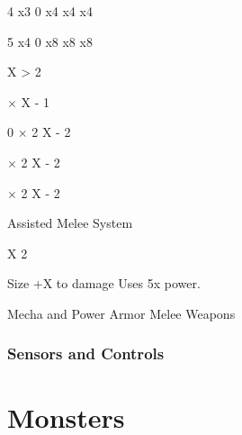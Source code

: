 \documentclass[twoside]{book}
\begin{document}
                  
                   4   
                   x3   
                   0   
                   x4   
                   x4   
                   x4   
                  
                  
                   5   
                   x4   
                   0   
                   x8   
                   x8   
                   x8   
                  
                  
                         X    >  
                      2   
                    
                         \ensuremath{\times}      X
                        -    1    
                     
                    
                   0   
                       \ensuremath{\times}   
                             2      X  
                            -    2   
                            
                    
                       \ensuremath{\times}   
                             2      X  
                            -    2   
                            
                    
                       \ensuremath{\times}   
                             2      X  
                            -    2   
                            
                    
                  
                  
                   Assisted Melee System   
                    
                         X    2   
                        
                    
                   Size   
                   +X to damage   
                   Uses 5x power.   
                  
                
              Mecha and Power Armor Melee Weapons  
            
\subsection{Sensors and Controls}
    
\chapter{Monsters}
    
\end{document}
